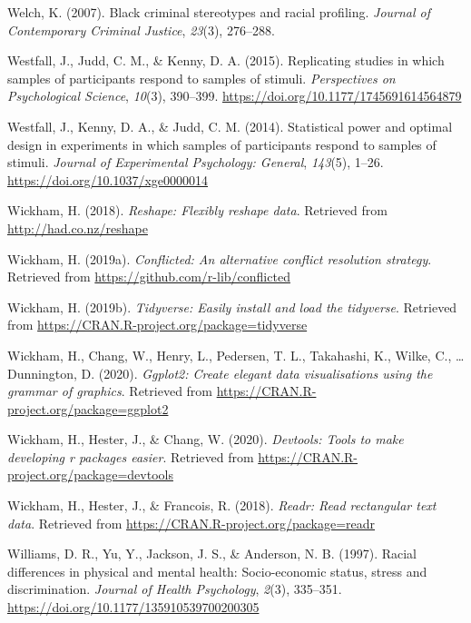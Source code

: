 \documentclass[
  english,
  man, noextraspace,floatsintext]{apa6}
\newlength{\cslhangindent}
\newenvironment{cslreferences}%
  {\setlength{\parindent}{0pt}%
  \everypar{\setlength{\hangindent}{\cslhangindent}}\ignorespaces}%
  {\par}
\begin{document}
\begin{cslreferences}
\leavevmode\hypertarget{ref-Welch2007}{}%
Welch, K. (2007). Black criminal stereotypes and racial profiling. \emph{Journal of Contemporary Criminal Justice}, \emph{23}(3), 276--288.

\leavevmode\hypertarget{ref-Westfall2015}{}%
Westfall, J., Judd, C. M., \& Kenny, D. A. (2015). Replicating studies in which samples of participants respond to samples of stimuli. \emph{Perspectives on Psychological Science}, \emph{10}(3), 390--399. \url{https://doi.org/10.1177/1745691614564879}

\leavevmode\hypertarget{ref-Westfall2014}{}%
Westfall, J., Kenny, D. A., \& Judd, C. M. (2014). Statistical power and optimal design in experiments in which samples of participants respond to samples of stimuli. \emph{Journal of Experimental Psychology: General}, \emph{143}(5), 1--26. \url{https://doi.org/10.1037/xge0000014}

\leavevmode\hypertarget{ref-R-reshape}{}%
Wickham, H. (2018). \emph{Reshape: Flexibly reshape data}. Retrieved from \url{http://had.co.nz/reshape}

\leavevmode\hypertarget{ref-R-conflicted}{}%
Wickham, H. (2019a). \emph{Conflicted: An alternative conflict resolution strategy}. Retrieved from \url{https://github.com/r-lib/conflicted}

\leavevmode\hypertarget{ref-R-tidyverse}{}%
Wickham, H. (2019b). \emph{Tidyverse: Easily install and load the tidyverse}. Retrieved from \url{https://CRAN.R-project.org/package=tidyverse}

\leavevmode\hypertarget{ref-R-ggplot2}{}%
Wickham, H., Chang, W., Henry, L., Pedersen, T. L., Takahashi, K., Wilke, C., \ldots{} Dunnington, D. (2020). \emph{Ggplot2: Create elegant data visualisations using the grammar of graphics}. Retrieved from \url{https://CRAN.R-project.org/package=ggplot2}

\leavevmode\hypertarget{ref-R-devtools}{}%
Wickham, H., Hester, J., \& Chang, W. (2020). \emph{Devtools: Tools to make developing r packages easier}. Retrieved from \url{https://CRAN.R-project.org/package=devtools}

\leavevmode\hypertarget{ref-R-readr}{}%
Wickham, H., Hester, J., \& Francois, R. (2018). \emph{Readr: Read rectangular text data}. Retrieved from \url{https://CRAN.R-project.org/package=readr}

\leavevmode\hypertarget{ref-Williams1997}{}%
Williams, D. R., Yu, Y., Jackson, J. S., \& Anderson, N. B. (1997). Racial differences in physical and mental health: Socio-economic status, stress and discrimination. \emph{Journal of Health Psychology}, \emph{2}(3), 335--351. \url{https://doi.org/10.1177/135910539700200305}


\end{cslreferences}
\end{document}

